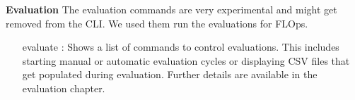 \vspace{5mm}
\textbf{Evaluation}\newline
The evaluation commands are very experimental and might get removed from the CLI.
We used them run the evaluations for FLOps.

\begin{itemize}
    \item [evaluate]:
        Shows a list of commands to control evaluations.
        This includes starting manual or automatic evaluation cycles or displaying CSV files that get populated during evaluation.
        Further details are available in the evaluation chapter.
\end{itemize}